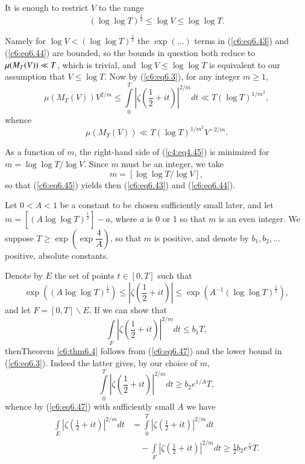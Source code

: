\medskip
{} It is enough to
restrict $V$ to the range 
$$
(\log \log T)^{\frac{1}{2}} \leq \log V \leq \log \log T. 
$$

Namely for $\log V < (\log \log T)^{\frac{1}{2}}$ the $\exp (\ldots)$
terms in (\ref{c6:eq6.43}) and (\ref{c6:eq6.44}) are bounded, so the
bounds in question both reduce to $\mu(M_T (V))\break \ll T$, which is
trivial, and $\log V \leq \log \log T$ is equivalent to our assumption
that $V \leq \log T$. Now by (\ref{c6:eq6.3}), for any integer $m \geq
1$, 
$$
\mu(M_T (V)) V^{2/m} \leq \int\limits^T_0 \left|\zeta
\left(\frac{1}{2} + it \right)\right|^{2/m} dt \ll T(\log T)^{1/m^2},  
$$
whence
\begin{equation}
\mu(M_T(V)) \ll T(\log T)^{1/m^2} V^{-2/m}.\label{c6:eq6.45}
\end{equation}

As a function of $m$, the right-hand side of (\ref{c4:eq4.45}) is
minimized for $m = \log \log T/\log V$. Since $m$ must be an integer,
we take  
$$
m = [\log \log T / \log V],
$$
so that (\ref{c6:eq6.45}) yields then (\ref{c6:eq6.43}) and
(\ref{c6:eq6.44}). 

\medskip
{} Let $0 < A < 1$
be a constant to be chosen sufficiently small later, and let $m = [(A
  \log \log T)^{\frac{1}{2}}] -a$, where $a$ is 0 or 1 so that $m$ is
an even integer. We suppose $T \geq \exp \left(\exp \dfrac{4}{A}
\right)$, so that $m$ is positive, and denote by $b_1, b_2, \ldots$
positive, absolute constants. 

Denote by $E$ the set of points $t \in [0,T]$ such that
\begin{equation}
\exp \left((A \log \log T)^{\frac{1}{2}}\right) \leq \left|\zeta
\left(\frac{1}{2} + it \right)\right| \leq \exp \left(A^{-1} (\log
\log T)^{\frac{1}{2}}\right),\label{c6:eq6.46}
\end{equation}
and let $F = [0,T] \backslash E$. If we can show that 
\begin{equation}
\int\limits_F \left|\zeta \left(\frac{1}{2} + it \right)\right|^{2/m}
dt \leq b_1 T,\label{c6:eq6.47} 
\end{equation}
then\pageoriginale Theorem \ref{c6:thm6.4} follows from
(\ref{c6:eq6.47}) and the lower bound in (\ref{c6:eq6.3}). Indeed the
latter gives, by our choice of $m$, 
$$
\int\limits^T_0 \left|\zeta \left(\frac{1}{2} + it
\right)\right|^{2/m} dt \geq b_2 e^{1/A} T, 
$$
whence by (\ref{c6:eq6.47}) with sufficiently small $A$ we have
\begin{align*} 
\int\limits_E \left|\zeta \left(\frac{1}{2} + it \right)\right|^{2/m} dt &=
\int\limits^T_0 \left|\zeta \left(\frac{1}{2} + it
\right)\right|^{2/m} dt\\ 
&\quad-\int\limits_F \left|\zeta \left(\frac{1}{2} + it \right)\right|^{2/m} dt \geq
\frac{1}{2} b_2 e^{\frac{1}{A}} T. 
\end{align*}

